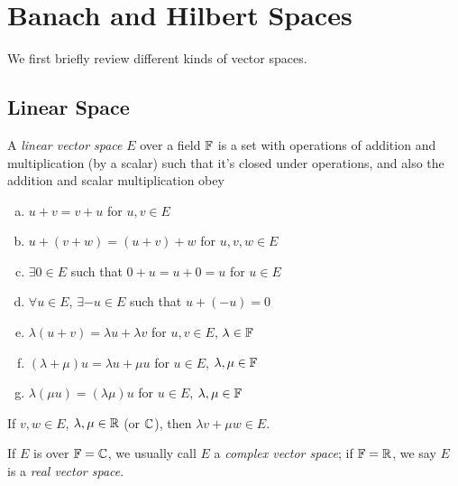 \chapter{Banach and Hilbert Spaces}

We first briefly review different kinds of vector spaces.

\section{Linear Space}

\begin{definition}\label{def:linear-vector-space}
	A \emph{linear vector space} \(E\) over a field \(\mathbb{\MakeUppercase{f}} \) is a set with operations of addition and multiplication (by a scalar) such that it's closed under operations, and also the addition and scalar multiplication obey
	\begin{enumerate}[(a)]
		\item \(u + v = v + u\) for \(u, v\in E\)
		\item \(u + (v + w) = (u + v) + w\) for \(u, v, w\in E\)
		\item \(\exists 0\in E\) such that \(0 + u = u + 0 = u\) for \(u\in E\)
		\item \(\forall u\in E\), \(\exists -u\in E\) such that \(u + (- u) = 0\)
		\item \(\lambda (u + v) = \lambda u + \lambda v\) for \(u, v\in E\), \(\lambda \in \mathbb{\MakeUppercase{f}} \)
		\item \((\lambda + \mu ) u = \lambda u + \mu u\) for \(u\in E\), \(\lambda , \mu \in \mathbb{\MakeUppercase{f}} \)
		\item \(\lambda (\mu u) = (\lambda \mu )u\) for \(u\in E\), \(\lambda , \mu \in \mathbb{\MakeUppercase{f}} \)
	\end{enumerate}
\end{definition}

\begin{remark}
	If \(v, w\in E\), \(\lambda , \mu \in \mathbb{\MakeUppercase{r}} \) (or \(\mathbb{\MakeUppercase{c}} \)), then \(\lambda v + \mu w\in E\).
\end{remark}

\begin{notation}
	If \(E\) is over \(\mathbb{\MakeUppercase{f}} = \mathbb{\MakeUppercase{c}} \), we usually call \(E\) a \emph{complex vector space}; if \(\mathbb{\MakeUppercase{f}} = \mathbb{\MakeUppercase{r}} \), we say \(E\) is a \emph{real vector space}.
\end{notation}

